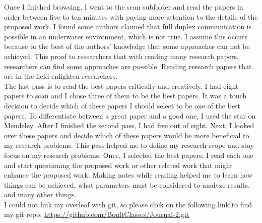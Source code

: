 \documentclass{article}
\begin{document}
Once I finished browsing, I went to the scan subfolder and read the papers in order between five to ten minutes with paying more attention to the details of the proposed work. I found some authors claimed that full duplex communication is possible in an underwater environment, which is not true. I assume this occurs because to the best of the authors' knowledge that some approaches can not be achieved. This proof to researchers that with reading many research papers, researchers can find some approaches are possible. Reading research papers that are in the field enlighten researchers.\\

The last pass is to read the best papers critically and creatively. I had eight papers to scan and I chose three of them to be the best papers. It was a touch decision to decide which of these papers I should select to be one of the best papers. To differentiate between a great paper and a good one, I used the star on Mendeley. After I finished the second pass, I had five out of eight. Next, I looked over these papers and decide which of these papers would be more beneficial to my research problems. This pass helped me to define my research scope and stay focus on my research problems. Once, I selected the best papers, I read each one and start questioning the proposed work or other related work that might enhance the proposed work. Making notes while reading helped me to learn how things can be achieved, what parameters must be considered to analyze results, and many other things. \\ 

I could not link my overleaf with git, so please click on the following link to find my git repo:
\url{https://github.com/BoultClasses/Journal-2.git}
\end{document}
